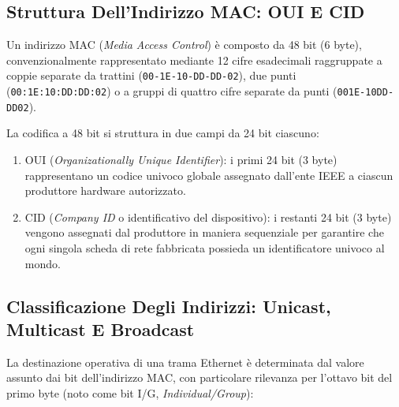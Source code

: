 \documentclass[11pt, a4paper]{article}
\begin{document}
\subsection{Struttura Dell'Indirizzo MAC: OUI E CID}

Un indirizzo MAC (\emph{Media Access Control}) è composto da 48 bit (6 byte), convenzionalmente rappresentato mediante 12 cifre esadecimali raggruppate a coppie separate da trattini (\texttt{00-1E-10-DD-DD-02}), due punti (\texttt{00:1E:10:DD:DD:02}) o a gruppi di quattro cifre separate da punti (\texttt{001E-10DD-DD02}).


La codifica a 48 bit si struttura in due campi da 24 bit ciascuno:
\begin{enumerate}
    \item OUI (\emph{Organizationally Unique Identifier}): i primi 24 bit (3 byte) rappresentano un codice univoco globale assegnato dall'ente IEEE a ciascun produttore hardware autorizzato.
    \item CID (\emph{Company ID} o identificativo del dispositivo): i restanti 24 bit (3 byte) vengono assegnati dal produttore in maniera sequenziale per garantire che ogni singola scheda di rete fabbricata possieda un identificatore univoco al mondo.
\end{enumerate}


\subsection{Classificazione Degli Indirizzi: Unicast, Multicast E Broadcast}

La destinazione operativa di una trama Ethernet è determinata dal valore assunto dai bit dell'indirizzo MAC, con particolare rilevanza per l'ottavo bit del primo byte (noto come bit I/G, \emph{Individual/Group}):

\end{document}
